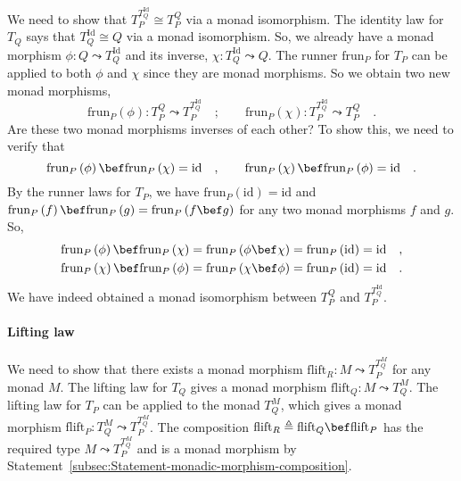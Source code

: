 We need to show that $T_{P}^{T_{Q}^{\text{Id}}}\cong T_{P}^{Q}$ via
a monad isomorphism. The identity law for $T_{Q}$ says that $T_{Q}^{\text{Id}}\cong Q$
via a monad isomorphism. So, we already have a monad morphism $\phi:Q\leadsto T_{Q}^{\text{Id}}$
and its inverse, $\chi:T_{Q}^{\text{Id}}\leadsto Q$. The runner $\text{frun}_{P}$
for $T_{P}$ can be applied to both $\phi$ and $\chi$ since they
are monad morphisms. So we obtain two new monad morphisms,
\[
\text{frun}_{P}\left(\phi\right):T_{P}^{Q}\leadsto T_{P}^{T_{Q}^{\text{Id}}}\quad;\quad\quad\text{frun}_{P}\left(\chi\right):T_{P}^{T_{Q}^{\text{Id}}}\leadsto T_{P}^{Q}\quad.
\]
Are these two monad morphisms inverses of each other? To show this,
we need to verify that
\[
\text{frun}_{P}\left(\phi\right)\bef\text{frun}_{P}\left(\chi\right)=\text{id}\quad,\quad\quad\text{frun}_{P}\left(\chi\right)\bef\text{frun}_{P}\left(\phi\right)=\text{id}\quad.
\]
By the runner laws for $T_{P}$, we have $\text{frun}_{P}\left(\text{id}\right)=\text{id}$
and $\text{frun}_{P}\left(f\right)\bef\text{frun}_{P}\left(g\right)=\text{frun}_{P}\left(f\bef g\right)$
for any two monad morphisms $f$ and $g$. So, 
\begin{align*}
\text{frun}_{P}\left(\phi\right)\bef\text{frun}_{P}\left(\chi\right) & =\text{frun}_{P}\left(\phi\bef\chi\right)=\text{frun}_{P}\left(\text{id}\right)=\text{id}\quad,\\
\text{frun}_{P}\left(\chi\right)\bef\text{frun}_{P}\left(\phi\right) & =\text{frun}_{P}\left(\chi\bef\phi\right)=\text{frun}_{P}\left(\text{id}\right)=\text{id}\quad.
\end{align*}
We have indeed obtained a monad isomorphism between $T_{P}^{Q}$ and
$T_{P}^{T_{Q}^{\text{Id}}}$.

\paragraph{Lifting law}

We need to show that there exists a monad morphism $\text{flift}_{R}:M\leadsto T_{P}^{T_{Q}^{M}}$
for any monad $M$. The lifting law for $T_{Q}$ gives a monad morphism
$\text{flift}_{Q}:M\leadsto T_{Q}^{M}$. The lifting law for $T_{P}$
can be applied to the monad $T_{Q}^{M}$, which gives a monad morphism
$\text{flift}_{P}:T_{Q}^{M}\leadsto T_{P}^{T_{Q}^{M}}$. The composition
$\text{flift}_{R}\triangleq\text{flift}_{Q}\bef\text{flift}_{P}$
has the required type $M\leadsto T_{P}^{T_{Q}^{M}}$ and is a monad
morphism by Statement~\ref{subsec:Statement-monadic-morphism-composition}.

